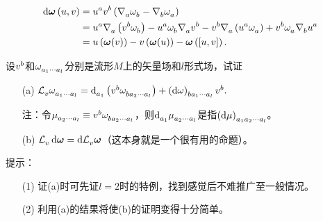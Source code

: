 \begin{xiti}
	\begin{zm}
		\begin{align*}
		\dd{\bm{\omega}} (u,v) &= \tensor{u}{^a} \tensor{v}{^b} \left( \Nabla{a} \tensor{\omega}{_b} - \Nabla{b} \tensor{\omega}{_a} \right)\\
		&= \tensor{u}{^a} \Nabla{a} \left( \tensor{v}{^b} \tensor{\omega}{_b} \right) - \tensor{u}{^a} \tensor{\omega}{_b} \Nabla{a} \tensor{v}{^b} - \tensor{v}{^b} \Nabla{a} \left( \tensor{u}{^a} \tensor{\omega}{_a} \right) + \tensor{v}{^b} \tensor{\omega}{_a} \Nabla{b} \tensor{u}{^a}\\
		&= u\left( \bm{\omega} (v) \right) - v \left( \bm{\omega} (u) \right) - \bm{\omega} \left( [u,v] \right).
		\end{align*}
	\end{zm}
	
	\item 设$\tensor{v}{^b} $和$\tensor{\omega}{_{a_1 \cdots a_l}} $分别是流形$M$上的矢量场和$l$形式场，试证
	\begin{enumerate}
		\item[(a)] \hypertarget{5.6.a}{}$\Ld{v} \tensor{\omega}{_{a_1 \cdots a_l}} = \dd\indices{_{a_1}} \left( \tensor{v}{^b} \tensor{\omega}{_{ba_2 \cdots a_l}} \right) + \tensor{\left( \dd{\omega} \right)}{_{ba_1 \cdots a_l}} \tensor{v}{^b}. $
		
		注：令$\tensor{\mu}{_{a_2 \cdots a_l}} \equiv \tensor{v}{^b} \tensor{\omega}{_{ba_2 \cdots a_l}} $，则$\dd\indices{_{a_1}} \tensor{\mu}{_{a_2 \cdots a_l}} $是指$\tensor{\left(\dd{\mu}\right)}{_{a_1 a_2 \cdots a_l }} $。
		\item[(b)] $\Ld{v} \dd{\boldsymbol{\omega}} = \dd{\Ld{v}\boldsymbol{\omega}} $（这本身就是一个很有用的命题）。
	\end{enumerate}
    
    提示：
    \begin{enumerate}
    	\item[(1)] 证(a)时可先证$l=2$时的特例，找到感觉后不难推广至一般情况。
    	\item[(2)] 利用(a)的结果将使(b)的证明变得十分简单。
    \end{enumerate}


\end{xiti}

